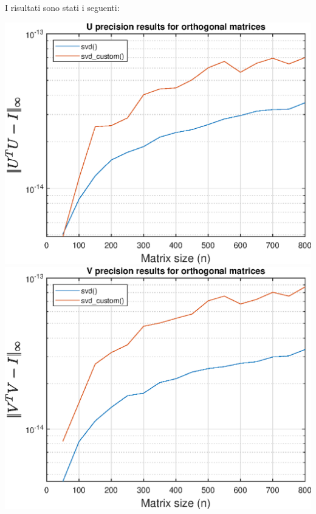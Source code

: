 I risultati sono stati i seguenti:

\centering
\par \vspace{15pt}
\includegraphics[scale=.9]{imgs/01_-_U_precision_results_for_orthogonal_matrices.eps}
\newpage
\includegraphics[scale=.9]{imgs/02_-_V_precision_results_for_orthogonal_matrices.eps}
\par \vspace{15pt}
